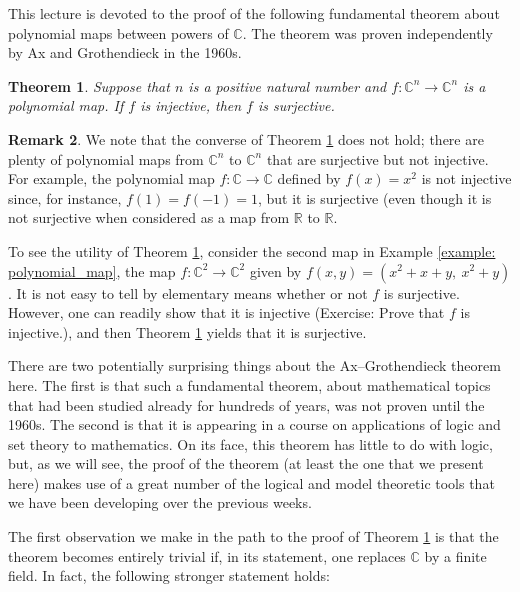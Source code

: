 \documentclass[a4paper]{memoir}
\newtheorem{theorem}{Theorem}[section]
\theoremstyle{definition}
\newtheorem{remark}[theorem]{Remark}
\newcommand{\bb}{\mathbb}
\newcommand{\ra}{\rightarrow}
\begin{document}
This lecture is devoted to the proof of the following fundamental theorem about polynomial 
maps between powers of $\bb{C}$. The theorem was proven independently by Ax and Grothendieck 
in the 1960s.

\begin{theorem} \label{thm: ax-grothendieck}
  Suppose that $n$ is a positive natural number and $f : \bb{C}^n \ra \bb{C}^n$ is a polynomial 
  map. If $f$ is injective, then $f$ is surjective.
\end{theorem}

\begin{remark}
  We note that the converse of Theorem \ref{thm: ax-grothendieck} does not hold; there are 
  plenty of polynomial maps from $\bb{C}^n$ to $\bb{C}^n$ that are surjective but not injective.
  For example, the polynomial map $f:\bb{C} \ra \bb{C}$ defined by $f(x) = x^2$ is not injective 
  since, for instance, $f(1) = f(-1) = 1$, but it is surjective (even though it is not surjective 
  when considered as a map from $\bb{R}$ to $\bb{R}$.
  
  To see the utility of Theorem \ref{thm: ax-grothendieck}, consider the second map in 
  Example \ref{example: polynomial_map}, the map $f: \bb{C}^2 \ra \bb{C}^2$ given by 
  $f(x,y) = (x^2 + x + y, \ x^2 + y)$. It is not easy to tell by elementary means whether or 
  not $f$ is surjective. However, one can readily show that it is injective (Exercise: Prove that 
  $f$ is injective.), and then Theorem \ref{thm: ax-grothendieck} yields that it is surjective.
\end{remark}

There are two potentially surprising things about the Ax--Grothendieck theorem here. The first is 
that such a fundamental theorem, about mathematical topics that had been studied already for 
hundreds of years, was not proven until the 1960s. The second is that it is appearing in a course 
on applications of logic and set theory to mathematics. On its face, this theorem has little to 
do with logic, but, as we will see, the proof of the theorem (at least the one that we present here) 
makes use of a great number of the logical and model theoretic tools that we have been developing 
over the previous weeks.

The first observation we make in the path to the proof of Theorem \ref{thm: ax-grothendieck} is 
that the theorem becomes entirely trivial if, in its statement, one replaces $\bb{C}$ by a 
finite field. In fact, the following stronger statement holds:
\end{document}
